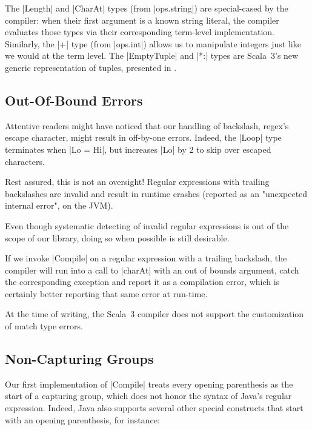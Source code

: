 \regexFirstIteration

\noindent
The |Length| and |CharAt| types (from |ops.string|) are special-cased by the compiler: when their first argument is a known string literal, the compiler evaluates those types via their corresponding term-level implementation.
Similarly, the |+| type (from |ops.int|) allows us to manipulate integers just like we would at the term level.
The |EmptyTuple| and |*:| types are Scala~3's new generic representation of tuples, presented in .

\subsection{Out-Of-Bound Errors}

Attentive readers might have noticed that our handling of backslash, regex's escape character, might result in off-by-one errors.
Indeed, the |Loop| type terminates when |Lo = Hi|, but increases |Lo| by 2 to skip over escaped characters.

Rest assured, this is not an oversight!
Regular expressions with trailing backslashes are invalid and result in runtime crashes (reported as an "unexpected internal error", on the JVM).
\begin{diff}
Even though systematic detecting of invalid regular expressions is out of the scope of our library, doing so when possible is still desirable.
\end{diff}
If we invoke |Compile| on a regular expression with a trailing backslash, the compiler will run into a call to |charAt| with an out of bounds argument, catch the corresponding exception and report it as a compilation error, which is certainly better reporting that same error at run-time.
\begin{diff}
At the time of writing, the Scala~3 compiler does not support the customization of match type errors.
\end{diff}

\subsection{Non-Capturing Groups}
\label{subsec:non-capturing-groups}

Our first implementation of |Compile| treats every opening parenthesis as the start of a capturing group, which does not honor the syntax of Java's regular expression.
Indeed, Java also supports several other special constructs that start with an opening parenthesis, for instance:

